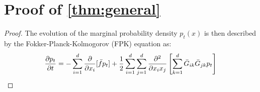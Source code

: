 \section{Proof of \cref{thm:general}}
\label{sec:mainresult_proof_app}

\mainresult*
\begin{proof}
The evolution of the marginal probability density $p_t(x)$ is then described by the Fokker-Planck-Kolmogorov (FPK) equation \citep{sarkka2019applied} as:
\begin{align}
\label{eq:full_fpk_expanded}
\frac{\partial p_t}{\partial t} = -\sum_{i=1}^{d} \frac{\partial}{\partial x_i}[\bar f p_t] + \frac{1}{2}\sum_{i=1}^{d}\sum_{j=1}^{d} \frac{\partial^2}{\partial x_ix_j}\left[\sum_{k=1}^{d}\bar G_{ik}\bar G_{jk}p_t \right]
\end{align}


\end{proof}
